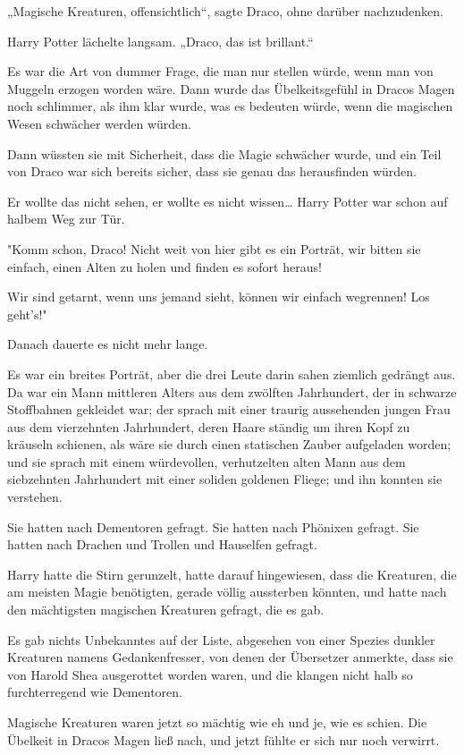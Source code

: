 {„Magische Kreaturen, offensichtlich“, sagte Draco, ohne darüber nachzudenken.

Harry Potter lächelte langsam. „Draco, das ist brillant.“

Es war die Art von dummer Frage, die man nur stellen würde, wenn man von Muggeln erzogen worden wäre. Dann wurde das Übelkeitsgefühl in Dracos Magen noch schlimmer, als ihm klar wurde, was es bedeuten würde, wenn die magischen Wesen schwächer werden würden.

Dann wüssten sie mit Sicherheit, dass die Magie schwächer wurde, und ein Teil von Draco war sich bereits sicher, dass sie genau das herausfinden würden.

Er wollte das nicht sehen, er wollte es nicht wissen… Harry Potter war schon auf halbem Weg zur Tür.

"Komm schon, Draco! Nicht weit von hier gibt es ein Porträt, wir bitten sie einfach, einen Alten zu holen und finden es sofort heraus!

Wir sind getarnt, wenn uns jemand sieht, können wir einfach wegrennen! Los geht's!"

Danach dauerte es nicht mehr lange.

Es war ein breites Porträt, aber die drei Leute darin sahen ziemlich gedrängt aus. Da war ein Mann mittleren Alters aus dem zwölften Jahrhundert, der in schwarze Stoffbahnen gekleidet war; der sprach mit einer traurig aussehenden jungen Frau aus dem vierzehnten Jahrhundert, deren Haare ständig um ihren Kopf zu kräuseln schienen, als wäre sie durch einen statischen Zauber aufgeladen worden; und sie sprach mit einem würdevollen, verhutzelten alten Mann aus dem siebzehnten Jahrhundert mit einer soliden goldenen Fliege; und ihn konnten sie verstehen.

Sie hatten nach Dementoren gefragt. Sie hatten nach Phönixen gefragt. Sie hatten nach Drachen und Trollen und Hauselfen gefragt.

Harry hatte die Stirn gerunzelt, hatte darauf hingewiesen, dass die Kreaturen, die am meisten Magie benötigten, gerade völlig aussterben könnten, und hatte nach den mächtigsten magischen Kreaturen gefragt, die es gab.

Es gab nichts Unbekanntes auf der Liste, abgesehen von einer Spezies dunkler Kreaturen namens Gedankenfresser, von denen der Übersetzer anmerkte, dass sie von Harold Shea ausgerottet worden waren, und die klangen nicht halb so furchterregend wie Dementoren.

Magische Kreaturen waren jetzt so mächtig wie eh und je, wie es schien. Die Übelkeit in Dracos Magen ließ nach, und jetzt fühlte er sich nur noch verwirrt.

}
